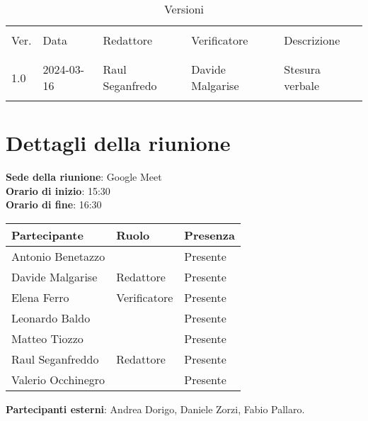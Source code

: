 \documentclass[italian,12pt]{article}
\begin{document}


\newpage



\begin{table}[!h]
	\caption{Versioni}
	\footnotesize
	\begin{center}
		\begin{tabular}{ l l l l p{6cm} }
			\hline                                                                              \\[-2ex]
			Ver. & Data       & Redattore          & Verificatore       & Descrizione           \\
			\\[-2ex] \hline \\[-1.5ex]
			1.0  & 2024-03-16 & Raul Seganfredo    & Davide Malgarise & Stesura verbale \\
			\\[-1.5ex] \hline
		\end{tabular}
	\end{center}
\end{table}

\newpage

\tableofcontents

\newpage

\section{Dettagli della riunione}


\textbf{Sede della riunione}: Google Meet\\
\textbf{Orario di inizio}: 15:30\\
\textbf{Orario di fine}: 16:30\\

\begin{flushleft}
	\begin{table}[!h]
	\begin{tabular}{ |l|l|l| } 
		\hline
		\textbf{Partecipante} & \textbf{Ruolo}       & \textbf{Presenza} \\
		\hline 
		Antonio Benetazzo     &                      & Presente          \\
		Davide Malgarise      & Redattore            & Presente          \\
		Elena Ferro           & Verificatore         & Presente          \\
		Leonardo Baldo        &                      & Presente          \\
		Matteo Tiozzo         &                      & Presente          \\
		Raul Seganfreddo      & Redattore			 & Presente          \\
		Valerio Occhinegro    &                      & Presente          \\
		\hline
	\end{tabular}
	\end{table}
	\textbf{Partecipanti esterni}: Andrea Dorigo, Daniele Zorzi, Fabio Pallaro.\\
\end{flushleft}
\end{document}
